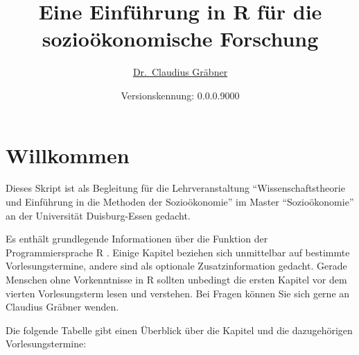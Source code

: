 \documentclass[]{book}
\title{Eine Einführung in R für die sozioökonomische Forschung}
\author{\href{http://claudius-graebner.com/}{Dr.~Claudius Gräbner}}
\date{Versionskennung: 0.0.0.9000}
\begin{document}
\maketitle

{
\setcounter{tocdepth}{1}
\tableofcontents
}
\chapter*{Willkommen}\label{willkommen}

Dieses Skript ist als Begleitung für die Lehrveranstaltung
``Wissenschaftstheorie und Einführung in die Methoden der
Sozioökonomie'' im Master ``Sozioökonomie'' an der Universität
Duisburg-Essen gedacht.

Es enthält grundlegende Informationen über die Funktion der
Programmiersprache R \citep{R-Team}. Einige Kapitel beziehen sich
unmittelbar auf bestimmte Vorlesungstermine, andere sind als optionale
Zusatzinformation gedacht. Gerade Menschen ohne Vorkenntnisse in R
sollten unbedingt die ersten Kapitel vor dem vierten Vorlesungsterm
lesen und verstehen. Bei Fragen können Sie sich gerne an Claudius
Gräbner wenden.

Die folgende Tabelle gibt einen Überblick über die Kapitel und die
dazugehörigen Vorlesungstermine:
\end{document}
